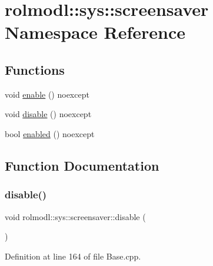 \hypertarget{namespacerolmodl_1_1sys_1_1screensaver}{}\section{rolmodl\+::sys\+::screensaver Namespace Reference}
\label{namespacerolmodl_1_1sys_1_1screensaver}
\subsection*{Functions}
\begin{DoxyCompactItemize}
\item 
void \mbox{\hyperlink{namespacerolmodl_1_1sys_1_1screensaver_ad15aee532dd048bea8a49642e6b36834}{enable}} () noexcept
\item 
void \mbox{\hyperlink{namespacerolmodl_1_1sys_1_1screensaver_a477fb240aa93290ce1b0fd9bdceac0fd}{disable}} () noexcept
\item 
bool \mbox{\hyperlink{namespacerolmodl_1_1sys_1_1screensaver_ab06a4017c36e60e6d3f00647b9c797c7}{enabled}} () noexcept
\end{DoxyCompactItemize}


\subsection{Function Documentation}
\mbox{\label{namespacerolmodl_1_1sys_1_1screensaver_a477fb240aa93290ce1b0fd9bdceac0fd}} 
\subsubsection{\texorpdfstring{disable()}{disable()}}
{\footnotesize\ttfamily void rolmodl\+::sys\+::screensaver\+::disable (\begin{DoxyParamCaption}{ }\end{DoxyParamCaption})\hspace{0.3cm}{\ttfamily [noexcept]}}



Definition at line 164 of file Base.\+cpp.

\mbox{\label{namespacerolmodl_1_1sys_1_1screensaver_ad15aee532dd048bea8a49642e6b36834}} 
